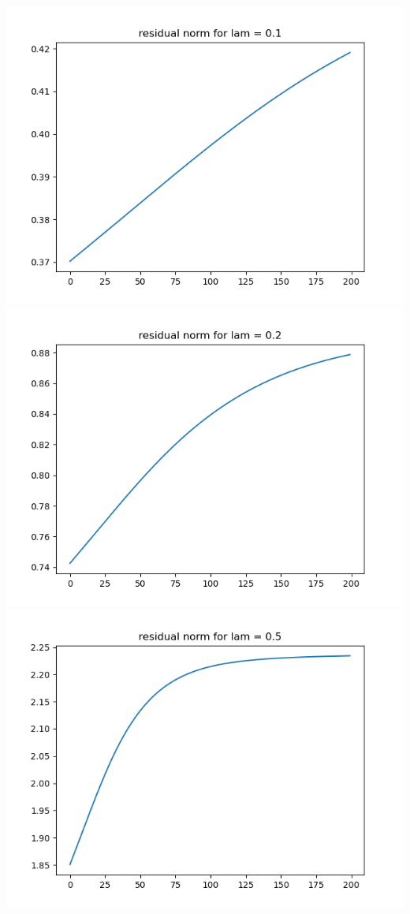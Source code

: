 \documentclass{article}
\begin{document}
\begin{enumerate}
\begin{enumerate}
\begin{center}
			\includegraphics[scale=.3]{hw7p1b residual norm for lamcount = 3}
			\includegraphics[scale=.3]{hw7p1b residual norm for lamcount = 4}
			\includegraphics[scale=.3]{hw7p1b residual norm for lamcount = 5}

\end{center}
\end{enumerate}
\end{enumerate}
\end{document}
